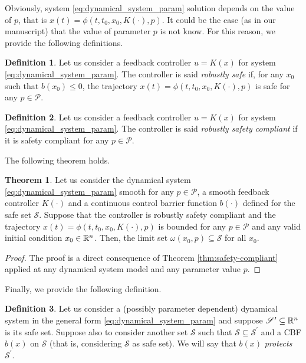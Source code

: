 \documentclass[letterpaper, 10 pt, conference]{ieeeconf}
\newcounter{Definition}
\theoremstyle{definition}
\theoremstyle{nopoint}
\newtheorem{definitionNoPoint}{Definition}
\newtheorem{theorem}{Theorem}[section]
\newcounter{Theorem}
\begin{document}
Obviously, system \eqref{eq:dynamical_system_param} solution depends on the value of $p$, that is  $x(t)=\phi(t,t_0,x_0,K(\cdot),p)$.
It could be the case (as in our manuscript) that the value of parameter $p$ is not know. For this reason,
we provide the following definitions. 

\begin{definitionNoPoint}
Let us consider a feedback controller $u=K(x)$ for system  \eqref{eq:dynamical_system_param}.
The controller is said {\em robustly safe} if, for any $x_0$ such that $b(x_0)\leq 0$, the trajectory  $x(t)=\phi(t,t_0,x_0,K(\cdot),p)$ is safe for any $p\in \mathcal{P}$.
\end{definitionNoPoint}


\begin{definitionNoPoint}
Let us consider a feedback controller $u=K(x)$ for system  \eqref{eq:dynamical_system_param}.
The controller is said {\em robustly safety compliant} if it is safety compliant for any $p\in \mathcal{P}$.
\end{definitionNoPoint}


The following theorem holds.

\begin{theorem} \label{lemma:safety-enforcing-robust}
Let us consider the dynamical system  \eqref{eq:dynamical_system_param} smooth for any $p\in\mathcal{P}$, a smooth feedback controller $K(\cdot)$ and a continuous control barrier function $b(\cdot)$ defined for the safe set $\mathcal{S}$. 
Suppose that the controller is robustly safety compliant and the trajectory
$x(t)=\phi(t,t_0,x_0,K(\cdot),p)$ is bounded for any $p\in\mathcal{P}$ and any valid initial condition $x_0\in\Bbb{R}^n$. Then, the limit set $\omega(x_0,p)\subseteq \mathcal{S}$ for all $x_0$.

\begin{proof}
The proof is a direct consequence of Theorem \ref{thm:safety-compliant} applied at any dynamical system model and any parameter value $p$.
\end{proof}
\end{theorem}


Finally, we provide the following definition. 

\begin{definitionNoPoint}\label{def:protecting_barrier}
Let us consider a (possibly parameter dependent) dynamical system in the general form \eqref{eq:dynamical_system_param} and suppose $\mathcal{S}^\prime\subseteq \Bbb{R}^n$ is its safe set. Suppose also to consider another set $\mathcal{S}$ such that $\mathcal{S}\subseteq \mathcal{S}^\prime$ and a CBF $b(x)$ on $\mathcal{S}$ (that is, considering $\mathcal{S}$ as safe set). We will say that $b(x)$ {\em protects} $\mathcal{S}^\prime$.
\end{definitionNoPoint}
\end{document}
